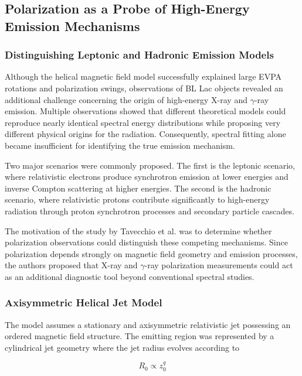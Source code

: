 \documentclass{article}
\begin{document}
\subsection{Polarization as a Probe of High-Energy Emission Mechanisms}

\subsubsection{Distinguishing Leptonic and Hadronic Emission Models}

Although the helical magnetic field model successfully explained large EVPA rotations and polarization swings, observations of BL Lac objects revealed an additional challenge concerning the origin of high-energy X-ray and $\gamma$-ray emission. Multiple observations showed that different theoretical models could reproduce nearly identical spectral energy distributions while proposing very different physical origins for the radiation. Consequently, spectral fitting alone became insufficient for identifying the true emission mechanism.

Two major scenarios were commonly proposed. The first is the leptonic scenario, where relativistic electrons produce synchrotron emission at lower energies and inverse Compton scattering at higher energies. The second is the hadronic scenario, where relativistic protons contribute significantly to high-energy radiation through proton synchrotron processes and secondary particle cascades.

The motivation of the study by Tavecchio et al. was to determine whether polarization observations could distinguish these competing mechanisms. Since polarization depends strongly on magnetic field geometry and emission processes, the authors proposed that X-ray and $\gamma$-ray polarization measurements could act as an additional diagnostic tool beyond conventional spectral studies.


\subsubsection{Axisymmetric Helical Jet Model}

The model assumes a stationary and axisymmetric relativistic jet possessing an ordered magnetic field structure. The emitting region was represented by a cylindrical jet geometry where the jet radius evolves according to

\begin{equation}
R_0 \propto z_0^q
\end{equation}
\end{document}
